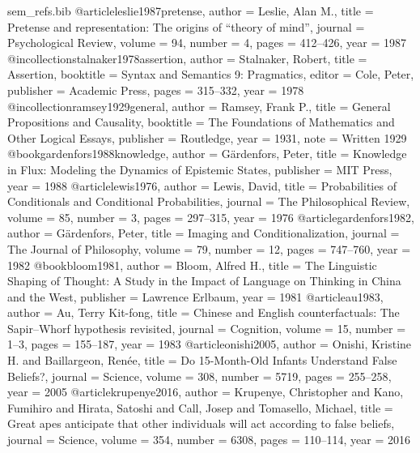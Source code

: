 \begin{filecontents}[overwrite]{sem_refs.bib}
@article{leslie1987pretense,
  author = {Leslie, Alan M.},
  title = {Pretense and representation: The origins of ``theory of mind''},
  journal = {Psychological Review}, volume = {94}, number = {4}, pages = {412--426}, year = {1987}}
@incollection{stalnaker1978assertion,
  author = {Stalnaker, Robert},
  title = {Assertion},
  booktitle = {Syntax and Semantics 9: Pragmatics}, editor = {Cole, Peter},
  publisher = {Academic Press}, pages = {315--332}, year = {1978}}
@incollection{ramsey1929general,
  author = {Ramsey, Frank P.},
  title = {General Propositions and Causality},
  booktitle = {The Foundations of Mathematics and Other Logical Essays},
  publisher = {Routledge}, year = {1931}, note = {Written 1929}}
@book{gardenfors1988knowledge,
  author = {G{\"a}rdenfors, Peter},
  title = {Knowledge in Flux: Modeling the Dynamics of Epistemic States},
  publisher = {MIT Press}, year = {1988}}
@article{lewis1976,
  author = {Lewis, David},
  title = {Probabilities of Conditionals and Conditional Probabilities},
  journal = {The Philosophical Review}, volume = {85}, number = {3}, pages = {297--315}, year = {1976}}
@article{gardenfors1982,
  author = {G{\"a}rdenfors, Peter},
  title = {Imaging and Conditionalization},
  journal = {The Journal of Philosophy}, volume = {79}, number = {12}, pages = {747--760}, year = {1982}}
@book{bloom1981,
  author = {Bloom, Alfred H.},
  title = {The Linguistic Shaping of Thought: A Study in the Impact of Language on Thinking in China and the West},
  publisher = {Lawrence Erlbaum}, year = {1981}}
@article{au1983,
  author = {Au, Terry Kit-fong},
  title = {Chinese and English counterfactuals: The Sapir--Whorf hypothesis revisited},
  journal = {Cognition}, volume = {15}, number = {1--3}, pages = {155--187}, year = {1983}}
@article{onishi2005,
  author = {Onishi, Kristine H. and Baillargeon, Ren{\'e}e},
  title = {Do 15-Month-Old Infants Understand False Beliefs?},
  journal = {Science}, volume = {308}, number = {5719}, pages = {255--258}, year = {2005}}
@article{krupenye2016,
  author = {Krupenye, Christopher and Kano, Fumihiro and Hirata, Satoshi and Call, Josep and Tomasello, Michael},
  title = {Great apes anticipate that other individuals will act according to false beliefs},
  journal = {Science}, volume = {354}, number = {6308}, pages = {110--114}, year = {2016}}


\end{filecontents}
